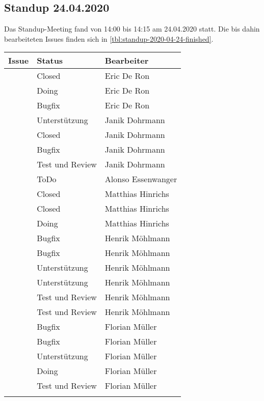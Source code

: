 	\subsection{Standup 24.04.2020}
	Das Standup-Meeting fand von 14:00 bis 14:15 am 24.04.2020 statt. Die bis dahin bearbeiteten Issues finden sich in \autoref{tbl:standup-2020-04-24-finished}.
		\begin{tabularx}{0.75\textwidth}{c|X|X}
			Issue 			& Status 			& Bearbeiter		\\
			\hline
			\issueref{31}	& Closed			& Eric De Ron		\\
			\issueref{37}	& Doing				& Eric De Ron		\\
			\issueref{45}	& Bugfix			& Eric De Ron		\\
			\issueref{42}	& Unterstützung 	& Janik Dohrmann	\\
			\issueref{30}	& Closed			& Janik Dohrmann	\\
			\issueref{47}	& Bugfix			& Janik Dohrmann	\\
			\issueref{31}	& Test und Review	& Janik Dohrmann	\\
			\issueref{34}	& ToDo				& Alonso Essenwanger\\
			\issueref{33}	& Closed			& Matthias Hinrichs	\\
			\issueref{35}	& Closed			& Matthias Hinrichs	\\
			\issueref{32}	& Doing				& Matthias Hinrichs	\\
			\issueref{47}	& Bugfix 			& Henrik Möhlmann	\\
			\issueref{45}	& Bugfix			& Henrik Möhlmann	\\
			\issueref{42}	& Unterstützung		& Henrik Möhlmann	\\
			\issueref{34}	& Unterstützung		& Henrik Möhlmann	\\
			\issueref{35}	& Test und Review	& Henrik Möhlmann	\\
			\issueref{33}	& Test und Review	& Henrik Möhlmann	\\
			\issueref{44}	& Bugfix			& Florian Müller	\\
			\issueref{43}	& Bugfix			& Florian Müller	\\
			\issueref{42}	& Unterstützung		& Florian Müller	\\
			\issueref{24}	& Doing				& Florian Müller	\\
			\issueref{30}	& Test und Review	& Florian Müller	\\
			\hline
			\caption{bearbeitete Issues}
			\label{tbl:standup-2020-04-24-finished}
		\end{tabularx}
